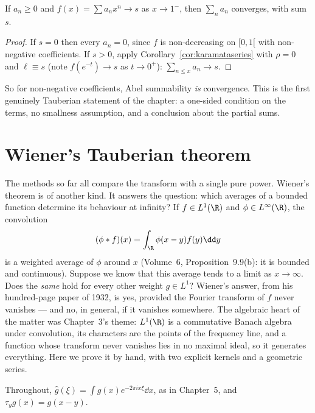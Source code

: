 \begin{corollary}\label{cor:abelconverse}
If $a_n\ge0$ and $f(x)=\sum a_nx^n\to s$ as $x\to1^-$, then $\sum_na_n$ converges, with sum $s$.
\end{corollary}
\begin{proof}
If $s=0$ then every $a_n=0$, since $f$ is non-decreasing on $[0,1[$ with non-negative coefficients. If $s>0$, apply
Corollary~\ref{cor:karamataseries} with $\rho=0$ and $\ell\equiv s$ (note $f(e^{-t})\to s$ as $t\to0^+$): $\sum_{n\le x}a_n\to s$.
\end{proof}

So for non-negative coefficients, Abel summability \emph{is} convergence. This is the first genuinely Tauberian statement of the chapter: a one-sided
condition on the terms, no smallness assumption, and a conclusion about the partial sums.

\section{Wiener's Tauberian theorem}

The methods so far all compare the transform with a single pure power. Wiener's theorem is of another kind. It answers the question: which averages of a
bounded function determine its behaviour at infinity? If $f\in L^1(\R)$ and $\phi\in L^\infty(\R)$, the convolution
\[
(\phi*f)(x)=\int_\R\phi(x-y)f(y)\dd y
\]
is a weighted average of $\phi$ around $x$ (Volume~6, Proposition~9.9(b): it is bounded and continuous). Suppose we know that this average tends to a limit as
$x\to\infty$. Does the \emph{same} hold for every other weight $g\in L^1$? Wiener's answer, from his hundred-page paper of 1932, is yes, provided the
Fourier transform of $f$ never vanishes --- and no, in general, if it vanishes somewhere. The algebraic heart of the matter was Chapter~3's theme: $L^1(\R)$
is a commutative Banach algebra under convolution, its characters are the points of the frequency line, and a function whose transform never vanishes lies
in no maximal ideal, so it generates everything. Here we prove it by hand, with two explicit kernels and a geometric series.

Throughout, $\hat g(\xi)=\int g(x)e^{-2\pi ix\xi}\dd x$, as in Chapter~5, and $\tau_yg(x)=g(x-y)$.

